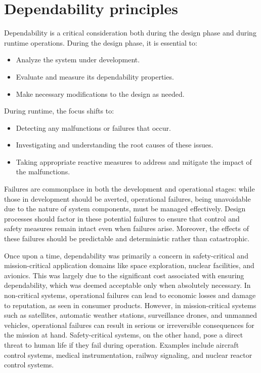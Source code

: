 \section{Dependability principles}

Dependability is a critical consideration both during the design phase and during runtime operations.
During the design phase, it is essential to:
\begin{itemize}
    \item Analyze the system under development.
    \item Evaluate and measure its dependability properties.
    \item Make necessary modifications to the design as needed.
\end{itemize}
During runtime, the focus shifts to:
\begin{itemize}
    \item Detecting any malfunctions or failures that occur.
    \item Investigating and understanding the root causes of these issues.
    \item Taking appropriate reactive measures to address and mitigate the impact of the malfunctions.
\end{itemize}
Failures are commonplace in both the development and operational stages: while those in development should be averted, operational failures, being unavoidable due to the nature of system components, must be managed effectively. 
Design processes should factor in these potential failures to ensure that control and safety measures remain intact even when failures arise. 
Moreover, the effects of these failures should be predictable and deterministic rather than catastrophic.

Once upon a time, dependability was primarily a concern in safety-critical and mission-critical application domains like space exploration, nuclear facilities, and avionics. 
This was largely due to the significant cost associated with ensuring dependability, which was deemed acceptable only when absolutely necessary.
In non-critical systems, operational failures can lead to economic losses and damage to reputation, as seen in consumer products. 
However, in mission-critical systems such as satellites, automatic weather stations, surveillance drones, and unmanned vehicles, operational failures can result in serious or irreversible consequences for the mission at hand.
Safety-critical systems, on the other hand, pose a direct threat to human life if they fail during operation.
Examples include aircraft control systems, medical instrumentation, railway signaling, and nuclear reactor control systems.